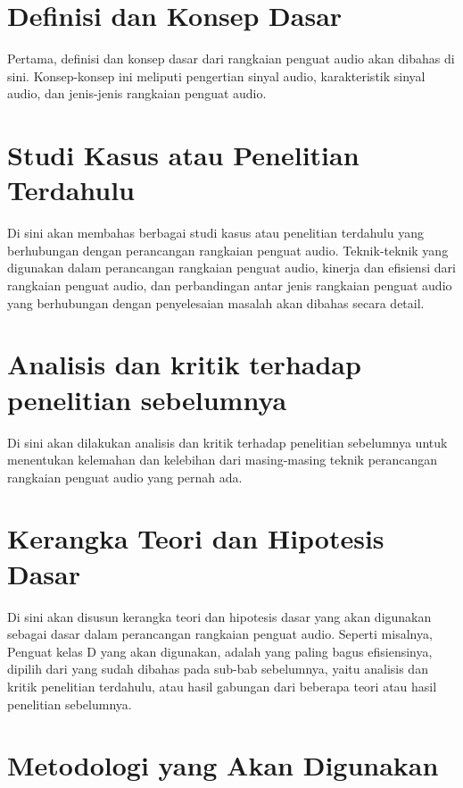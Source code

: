 \section{Definisi dan Konsep Dasar}
\label{ch2-definisi-dan-konsep-dasar}

Pertama, definisi dan konsep dasar dari rangkaian penguat audio akan dibahas di sini. Konsep-konsep ini meliputi pengertian sinyal audio, karakteristik sinyal audio, dan jenis-jenis rangkaian penguat audio.

\section{Studi Kasus atau Penelitian Terdahulu}

Di sini akan membahas berbagai studi kasus atau penelitian terdahulu yang berhubungan dengan perancangan rangkaian penguat audio. Teknik-teknik yang digunakan 
dalam perancangan rangkaian penguat audio, kinerja dan efisiensi dari rangkaian penguat audio, dan perbandingan antar jenis rangkaian penguat audio yang berhubungan dengan 
penyelesaian masalah akan dibahas secara detail.


\section{Analisis dan kritik terhadap penelitian sebelumnya}

Di sini akan dilakukan analisis dan kritik terhadap penelitian sebelumnya untuk menentukan kelemahan dan kelebihan dari masing-masing teknik perancangan rangkaian 
penguat audio yang pernah ada.


\section{Kerangka Teori dan Hipotesis Dasar}

Di sini akan disusun kerangka teori dan hipotesis dasar yang akan digunakan sebagai dasar dalam perancangan rangkaian penguat audio. Seperti misalnya, Penguat kelas D yang 
akan digunakan, adalah yang paling bagus efisiensinya, dipilih dari yang sudah dibahas pada sub-bab sebelumnya, yaitu analisis dan kritik penelitian terdahulu, atau hasil gabungan dari beberapa teori atau hasil penelitian sebelumnya.

\section{Metodologi yang Akan Digunakan}


